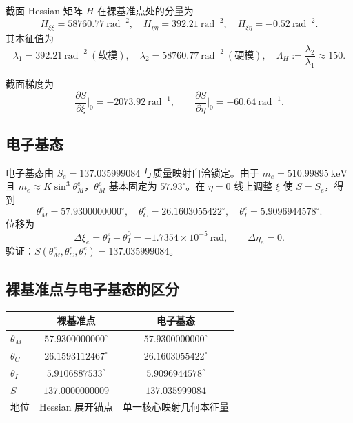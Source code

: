 \documentclass[12pt,a4paper]{article}
\theoremstyle{definition}
\begin{document}
截面 Hessian 矩阵 $H$ 在裸基准点处的分量为
\begin{equation}
H_{\xi\xi}=58760.77~\mathrm{rad}^{-2},\quad H_{\eta\eta}=392.21~\mathrm{rad}^{-2},\quad H_{\xi\eta}=-0.52~\mathrm{rad}^{-2}.
\end{equation}
其本征值为
\begin{equation}
\lambda_1=392.21~\mathrm{rad}^{-2}~(\text{软模}),\quad \lambda_2=58760.77~\mathrm{rad}^{-2}~(\text{硬模}),\quad \Lambda_H:=\frac{\lambda_2}{\lambda_1}\approx150.
\end{equation}

截面梯度为
\begin{equation}
\frac{\partial S}{\partial\xi}\bigg|_0=-2073.92~\mathrm{rad}^{-1},\qquad \frac{\partial S}{\partial\eta}\bigg|_0=-60.64~\mathrm{rad}^{-1}.
\end{equation}

\subsection{电子基态}

电子基态由 $S_e=137.035999084$ 与质量映射自洽锁定。由于 $m_e=510.99895~\mathrm{keV}$ 且 $m_e\approx K\sin^3\theta_M^e$，$\theta_M^e$ 基本固定为 $57.93^\circ$。在 $\eta=0$ 线上调整 $\xi$ 使 $S=S_e$，得到
\begin{equation}
\boxed{\theta_M^e=57.9300000000^\circ,\quad \theta_C^e=26.1603055422^\circ,\quad \theta_I^e=5.9096944578^\circ.}
\end{equation}
位移为
\begin{equation}
\Delta\xi_e=\theta_I^e-\theta_I^0=-1.7354\times10^{-5}~\mathrm{rad},\qquad \Delta\eta_e=0.
\end{equation}
验证：$S(\theta_M^e,\theta_C^e,\theta_I^e)=137.035999084$。

\subsection{裸基准点与电子基态的区分}

\begin{center}
\begin{tabular}{@{}lcc@{}}
\toprule
& 裸基准点 & 电子基态 \\
\midrule
$\theta_M$ & $57.9300000000^\circ$ & $57.9300000000^\circ$ \\
$\theta_C$ & $26.1593112467^\circ$ & $26.1603055422^\circ$ \\
$\theta_I$ & $5.9106887533^\circ$ & $5.9096944578^\circ$ \\
$S$ & $137.0000000009$ & $137.035999084$ \\
地位 & Hessian 展开锚点 & 单一核心映射几何本征量 \\
\bottomrule
\end{tabular}
\end{center}
\end{document}
